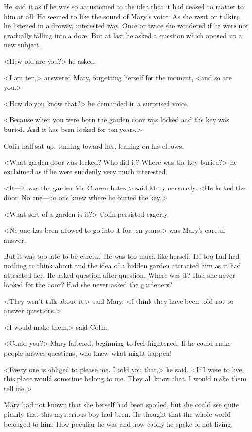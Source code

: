 He said it as if he was so accustomed to the idea that it had ceased to matter to him at all. He seemed to like the sound of Mary's voice. As she went on talking he listened in a drowsy, interested way. Once or twice she wondered if he were not gradually falling into a doze. But at last he asked a question which opened up a new subject.

<How old are you?> he asked.

<I am ten,> answered Mary, forgetting herself for the moment, <and so are you.>

<How do you know that?> he demanded in a surprised voice.

<Because when you were born the garden door was locked and the key was buried. And it has been locked for ten years.>

Colin half sat up, turning toward her, leaning on his elbows.

<What garden door was locked? Who did it? Where was the key buried?> he exclaimed as if he were suddenly very much interested.

<It—it was the garden Mr~Craven hates,> said Mary nervously. <He locked the door. No one—no one knew where he buried the key.>

<What sort of a garden is it?> Colin persisted eagerly.

<No one has been allowed to go into it for ten years,> was Mary's careful answer.

But it was too late to be careful. He was too much like herself. He too had had nothing to think about and the idea of a hidden garden attracted him as it had attracted her. He asked question after question. Where was it? Had she never looked for the door? Had she never asked the gardeners?

<They won't talk about it,> said Mary. <I think they have been told not to answer questions.>

<I would make them,> said Colin.

<Could you?> Mary faltered, beginning to feel frightened. If he could make people answer questions, who knew what might happen!

<Every one is obliged to please me. I told you that,> he said. <If I were to live, this place would sometime belong to me. They all know that. I would make them tell me.>

Mary had not known that she herself had been spoiled, but she could see quite plainly that this mysterious boy had been. He thought that the whole world belonged to him. How peculiar he was and how coolly he spoke of not living.

